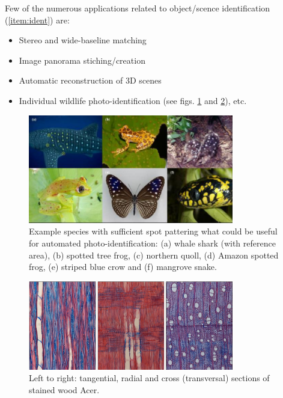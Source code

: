 Few of the numerous applications related to object/scence identification (\ref{item:ident}) are:
\begin{itemize}
\item Stereo and wide-baseline matching
\item Image panorama stiching/creation
\item Automatic reconstruction of 3D scenes
\item Individual wildlife photo-identification (see figs.  \ref{fig:photoid} and \ref{fig:woodphotoid}), etc.
\end{itemize}

\begin{figure}[H]
\begin{center}
\includegraphics[width=0.8\textwidth]{fig/photoid}
\end{center}
\caption{Example species with sufficient spot pattering what could be useful for automated photo-identification: (a) whale shark (with reference area),
(b) spotted  tree frog, (c) northern quoll, (d) Amazon spotted frog, (e) striped blue crow and (f) mangrove snake.}
\label{fig:photoid}
\end{figure}

\begin{figure}[H]
\begin{center}
\includegraphics[width=0.8\textwidth]{fig/woodphotoid}
\end{center}
\caption{Left to right: tangential, radial and cross (transversal) sections of stained wood Acer.}
\label{fig:woodphotoid}
\end{figure}

